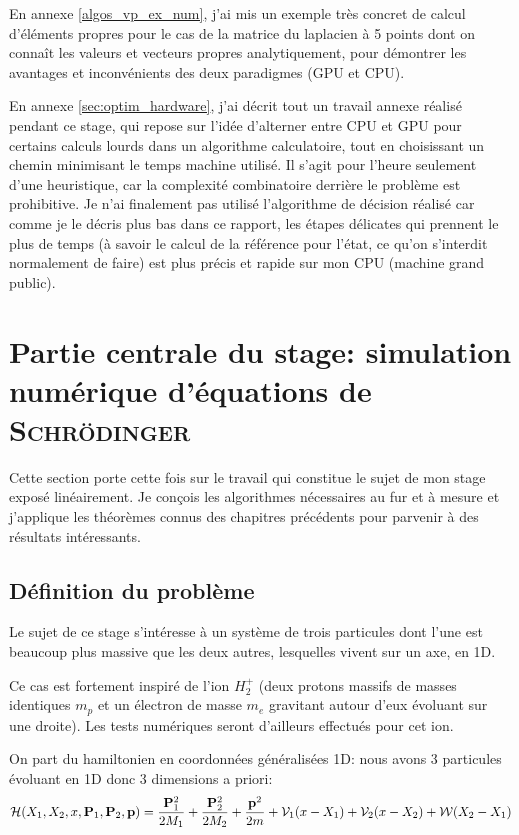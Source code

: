 \documentclass[svgnames,dvipsnames,a4paper,10pt,french]{report}
\begin{document}
En annexe \ref{algos_vp_ex_num}, j'ai mis un exemple très concret de calcul d'éléments propres pour le cas de la matrice du laplacien à 5 points dont on connaît les valeurs et vecteurs propres analytiquement, pour démontrer les avantages et inconvénients des deux paradigmes (GPU et CPU).

En annexe \ref{sec:optim_hardware}, j'ai décrit tout un travail annexe réalisé pendant ce stage, qui repose sur l'idée d'alterner entre CPU et GPU pour certains calculs lourds dans un algorithme calculatoire, tout en choisissant un chemin minimisant le temps machine utilisé. Il s'agit pour l'heure seulement d'une heuristique, car la complexité combinatoire derrière le problème est prohibitive. Je n'ai finalement pas utilisé l'algorithme de décision réalisé car comme je le décris plus bas dans ce rapport, les étapes délicates qui prennent le plus de temps (à savoir le calcul de la référence pour l'état, ce qu'on s'interdit normalement de faire) est plus précis et rapide sur mon CPU (machine grand public).

\chapter{Partie centrale du stage: simulation numérique d'équations de \textsc{Schrödinger}}

Cette section porte cette fois sur le travail qui constitue le sujet de mon stage exposé linéairement. Je conçois les algorithmes nécessaires au fur et à mesure et j'applique les théorèmes connus des chapitres précédents pour parvenir à des résultats intéressants.


\section{Définition du problème}
\label{sujet_stage}

Le sujet de ce stage s'intéresse à un système de trois particules dont l'une est beaucoup plus massive que les deux autres, lesquelles vivent sur un axe, en 1D.

Ce cas est fortement inspiré de l'ion $H_2^+$ (deux protons massifs de  masses identiques $m_p$ et un électron de masse $m_e$ gravitant autour d'eux évoluant sur une droite). Les tests numériques seront d'ailleurs effectués pour cet ion.

On part du hamiltonien en coordonnées généralisées 1D: nous avons 3 particules évoluant en 1D donc 3 dimensions a priori:
\begin{equation}
    \mathcal{H}(X_1,X_2,x, \mathbf{P}_1,\mathbf{P}_2,\mathbf{p}) = \frac{\mathbf{P}_1^2}{2M_1} + \frac{\mathbf{P}_2^2}{2M_2} + \frac{\mathbf{p}^2}{2m} + \mathcal{V}_1(x-X_1) + \mathcal{V}_2(x-X_2) + \mathcal{W}(X_2-X_1)
\end{equation}
\end{document}
